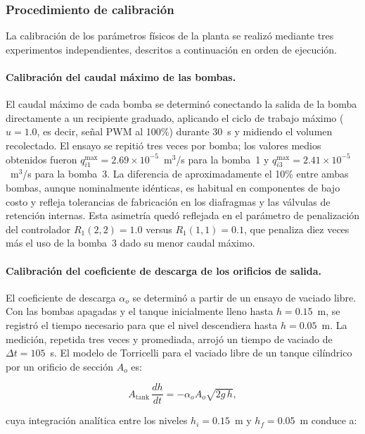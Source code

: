 \documentclass[12pt,letterpaper]{article}
\begin{document}
\subsubsection{Procedimiento de calibración}
\label{sec:calibracion}

La calibración de los parámetros físicos de la planta se realizó mediante 
tres experimentos independientes, descritos a continuación en orden de 
ejecución.

\paragraph{Calibración del caudal máximo de las bombas.}
El caudal máximo de cada bomba se determinó conectando la salida de la 
bomba directamente a un recipiente graduado, aplicando el ciclo de trabajo 
máximo ($u = 1.0$, es decir, señal PWM al 100\%) durante $30$~s y 
midiendo el volumen recolectado. El ensayo se repitió tres veces por 
bomba; los valores medios obtenidos fueron $q_{i1}^{\max} = 2.69 \times 
10^{-5}$~m$^3$/s para la bomba~1 y $q_{i3}^{\max} = 2.41 \times 
10^{-5}$~m$^3$/s para la bomba~3. La diferencia de aproximadamente el 
10\% entre ambas bombas, aunque nominalmente idénticas, es habitual en 
componentes de bajo costo y refleja tolerancias de fabricación en los 
diafragmas y las válvulas de retención internas. Esta asimetría quedó 
reflejada en el parámetro de penalización del controlador $R_1(2,2) = 
1.0$ versus $R_1(1,1) = 0.1$, que penaliza diez veces más el uso de la 
bomba~3 dado su menor caudal máximo.

\paragraph{Calibración del coeficiente de descarga de los orificios de 
salida.}
El coeficiente de descarga $\alpha_o$ se determinó a partir de un ensayo 
de vaciado libre. Con las bombas apagadas y el tanque inicialmente lleno 
hasta $h = 0.15$~m, se registró el tiempo necesario para que el nivel 
descendiera hasta $h = 0.05$~m. La medición, repetida tres veces y 
promediada, arrojó un tiempo de vaciado de $\Delta t = 105$~s. El modelo 
de Torricelli para el vaciado libre de un tanque cilíndrico por un 
orificio de sección $A_o$ es:

\begin{equation}
A_{\mathrm{tank}}\,\frac{dh}{dt} = -\alpha_o A_o \sqrt{2g\,h},
\label{eq:vaciado}
\end{equation}

cuya integración analítica entre los niveles $h_i = 0.15$~m y $h_f = 
0.05$~m conduce a:
\end{document}
